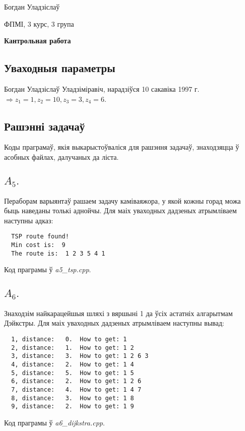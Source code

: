 \documentclass{article}
\begin{document}
{\large

Богдан Уладзіслаў

ФПМІ, 3 курс, 3 група

\vspace{5mm}

\textbf{Кантрольная работа}

}

\vspace{10mm}

\subsection*{Уваходныя параметры}

Богдан Уладзіслаў Уладзіміравіч, нарадзіўся 10 сакавіка 1997 г. $\Rightarrow z_1 = 1, z_2 = 10, z_3 = 3, z_4 = 6$.

\subsection*{Рашэнні задачаў}

Коды праграмаў, якія выкарыстоўваліся для рашэння задачаў, знаходзяцца ў асобных файлах, далучаных да ліста.

\subsection*{$A_5.$}
Пераборам варыянтаў рашаем задачу каміваяжора, у якой кожны горад можа быць наведаны толькі аднойчы.
Для маіх уваходных дадзеных атрымліваем наступны адказ:
\begin{verbatim}
  TSP route found!
  Min cost is:  9
  The route is:  1 2 3 5 4 1
\end{verbatim}
Код праграмы ў \textit{a5\_tsp.cpp}.

\subsection*{$A_6.$}
Знаходзім найкарацейшыя шляхі з вяршыні 1 да ўсіх астатніх алгарытмам Дэйкстры.
Для маіх уваходных дадзеных атрымліваем наступны вывад:
\begin{verbatim}
  1, distance:   0.  How to get: 1
  2, distance:   1.  How to get: 1 2
  3, distance:   3.  How to get: 1 2 6 3
  4, distance:   2.  How to get: 1 4
  5, distance:   5.  How to get: 1 5
  6, distance:   2.  How to get: 1 2 6
  7, distance:   4.  How to get: 1 4 7
  8, distance:   3.  How to get: 1 8
  9, distance:   2.  How to get: 1 9
\end{verbatim}
Код праграмы ў \textit{a6\_dijkstra.cpp}.
\end{document}
